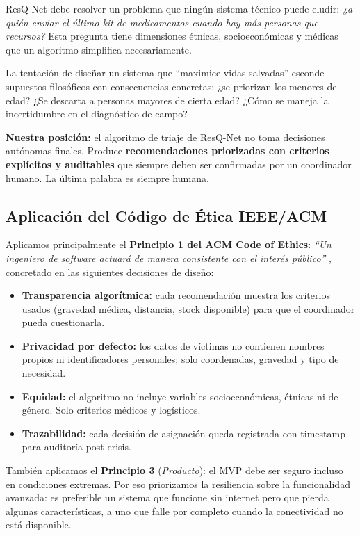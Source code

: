 \documentclass[12pt,a4paper]{article}
\begin{document}
ResQ-Net debe resolver un problema que ningún sistema técnico puede eludir:
\textit{¿a quién enviar el último kit de medicamentos cuando hay más personas
que recursos?} Esta pregunta tiene dimensiones étnicas, socioeconómicas y
médicas que un algoritmo simplifica necesariamente.

La tentación de diseñar un sistema que ``maximice vidas salvadas'' esconde
supuestos filosóficos con consecuencias concretas: ¿se priorizan los menores
de edad? ¿Se descarta a personas mayores de cierta edad? ¿Cómo se maneja la
incertidumbre en el diagnóstico de campo?

\textbf{Nuestra posición:} el algoritmo de triaje de ResQ-Net no toma
decisiones autónomas finales. Produce \textbf{recomendaciones priorizadas con
criterios explícitos y auditables} que siempre deben ser confirmadas por un
coordinador humano. La última palabra es siempre humana.

\subsection{Aplicación del Código de Ética IEEE/ACM}

Aplicamos principalmente el \textbf{Principio 1 del ACM Code of Ethics}:
\textit{``Un ingeniero de software actuará de manera consistente con el interés
público''} \cite{acm2018}, concretado en las siguientes decisiones de diseño:

\begin{itemize}[leftmargin=1.5em]
  \item \textbf{Transparencia algorítmica:} cada recomendación muestra los
        criterios usados (gravedad médica, distancia, stock disponible) para
        que el coordinador pueda cuestionarla.
  \item \textbf{Privacidad por defecto:} los datos de víctimas no contienen
        nombres propios ni identificadores personales; solo coordenadas,
        gravedad y tipo de necesidad.
  \item \textbf{Equidad:} el algoritmo no incluye variables socioeconómicas,
        étnicas ni de género. Solo criterios médicos y logísticos.
  \item \textbf{Trazabilidad:} cada decisión de asignación queda registrada
        con timestamp para auditoría post-crisis.
\end{itemize}

También aplicamos el \textbf{Principio 3} (\textit{Producto}): el MVP debe
ser seguro incluso en condiciones extremas. Por eso priorizamos la resiliencia
sobre la funcionalidad avanzada: es preferible un sistema que funcione sin
internet pero que pierda algunas características, a uno que falle por completo
cuando la conectividad no está disponible.
\end{document}
